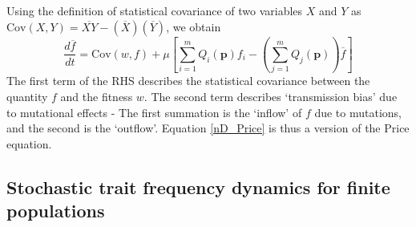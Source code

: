 Using the definition of statistical covariance of two variables $X$ and $Y$ as $\mathrm{Cov}(X,Y) = \overline{XY} - (\overline{X})(\overline{Y})$, we obtain
\begin{equation}
\label{nD_Price}
\frac{d\overline{f}}{dt} = \mathrm{Cov}(w,f) + \mu\left[\sum\limits_{i=1}^{m}Q_i(\mathbf{p})f_i - \left(\sum\limits_{j=1}^{m}Q_j(\mathbf{p})\right)\overline{f}\right]
\end{equation}
The first term of the RHS describes the statistical covariance between the quantity $f$ and the fitness $w$. The second term describes `transmission bias' due to mutational effects - The first summation is the `inflow' of $f$ due to mutations, and the second is the `outflow'. Equation \eqref{nD_Price} is thus a version of the Price equation.

\subsection{Stochastic trait frequency dynamics for finite populations}

